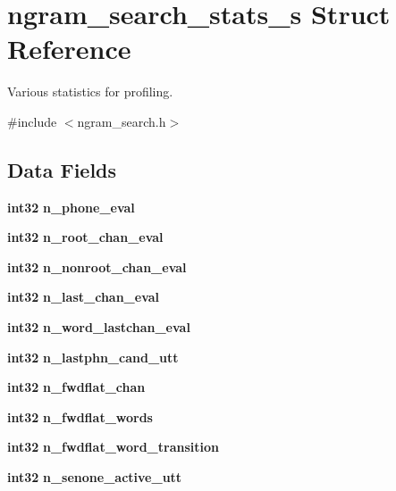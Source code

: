 \section{ngram\-\_\-search\-\_\-stats\-\_\-s \-Struct \-Reference}
\label{structngram__search__stats__s}


\-Various statistics for profiling.  




{\ttfamily \#include $<$ngram\-\_\-search.\-h$>$}

\subsection*{\-Data \-Fields}
\begin{DoxyCompactItemize}
\item 
{\bf int32} {\bfseries n\-\_\-phone\-\_\-eval}\label{structngram__search__stats__s_a853a3fbbba414afebca4250d4bbabcf9}

\item 
{\bf int32} {\bfseries n\-\_\-root\-\_\-chan\-\_\-eval}\label{structngram__search__stats__s_afdfb1e063532a44998af60704481e171}

\item 
{\bf int32} {\bfseries n\-\_\-nonroot\-\_\-chan\-\_\-eval}\label{structngram__search__stats__s_a4977b527bbb6a9e0f9961c4ed860f9ee}

\item 
{\bf int32} {\bfseries n\-\_\-last\-\_\-chan\-\_\-eval}\label{structngram__search__stats__s_a7f19ccd65dc15a2f9c9a78a23c2f2abc}

\item 
{\bf int32} {\bfseries n\-\_\-word\-\_\-lastchan\-\_\-eval}\label{structngram__search__stats__s_a7502d4c029445f41e8a1990220d1f503}

\item 
{\bf int32} {\bfseries n\-\_\-lastphn\-\_\-cand\-\_\-utt}\label{structngram__search__stats__s_a40d598bccdc1a919a0984391b8bd293a}

\item 
{\bf int32} {\bfseries n\-\_\-fwdflat\-\_\-chan}\label{structngram__search__stats__s_ad4717aa85b49d0e0eab0404c316810c6}

\item 
{\bf int32} {\bfseries n\-\_\-fwdflat\-\_\-words}\label{structngram__search__stats__s_a8cb73a5120ee87ff0044da0f7898a1df}

\item 
{\bf int32} {\bfseries n\-\_\-fwdflat\-\_\-word\-\_\-transition}\label{structngram__search__stats__s_ae308e5217d766e80724fcca1083ac5c7}

\item 
{\bf int32} {\bfseries n\-\_\-senone\-\_\-active\-\_\-utt}\label{structngram__search__stats__s_a08f5c672674fd24943448f0fde8633df}

\end{DoxyCompactItemize}


